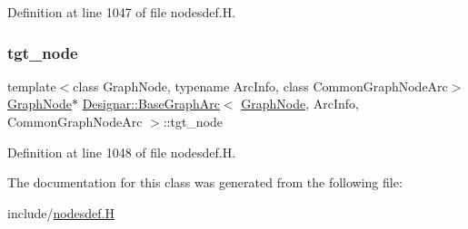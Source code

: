 Definition at line 1047 of file nodesdef.\+H.

\mbox{\label{class_designar_1_1_base_graph_arc_af09ee39743d9a2e6f7bad479d925c273}} 
\subsubsection{\texorpdfstring{tgt\+\_\+node}{tgt\_node}}
{\footnotesize\ttfamily template$<$class Graph\+Node, typename Arc\+Info, class Common\+Graph\+Node\+Arc$>$ \\
\hyperlink{class_designar_1_1_graph_node}{Graph\+Node}$\ast$ \hyperlink{class_designar_1_1_base_graph_arc}{Designar\+::\+Base\+Graph\+Arc}$<$ \hyperlink{class_designar_1_1_graph_node}{Graph\+Node}, Arc\+Info, Common\+Graph\+Node\+Arc $>$\+::tgt\+\_\+node\hspace{0.3cm}{\ttfamily [protected]}}



Definition at line 1048 of file nodesdef.\+H.



The documentation for this class was generated from the following file\+:\begin{DoxyCompactItemize}
\item 
include/\hyperlink{nodesdef_8_h}{nodesdef.\+H}\end{DoxyCompactItemize}
